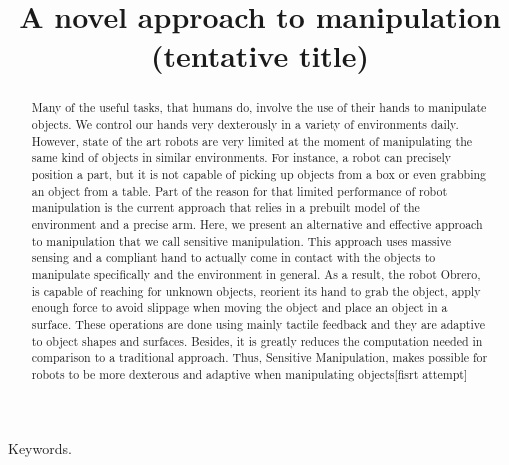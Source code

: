 \documentclass[conference,letterpaper]{IEEEtran}
\begin{document}
\title{\huge A novel approach to manipulation (tentative title)}

\author{
 \and
{}
}

\maketitle
\begin{abstract}
Many of the useful tasks, that humans do, involve the use of their
hands to manipulate objects. We control our hands very dexterously
in a variety of environments daily. However, state of the art
robots are very limited at the moment of manipulating the same
kind of objects in similar environments. For instance, a robot can
precisely position a part, but it is not capable of picking up
objects from a box or even grabbing an object from a table. Part
of the reason for that limited performance of robot manipulation
is the current approach that relies in a prebuilt model of the
environment and a precise arm. Here, we present an alternative and
effective approach to manipulation that we call sensitive
manipulation. This approach uses massive sensing and a compliant
hand to actually come in contact with the objects to manipulate
specifically and the environment in general. As a result, the
robot Obrero, is capable of reaching for unknown objects, reorient
its hand to grab the object, apply enough force to avoid slippage
when moving the object and place an object in a surface. These
operations are done using mainly tactile feedback and they are
adaptive to object shapes and surfaces. Besides, it is greatly
reduces the computation needed in comparison to a traditional
approach. Thus, Sensitive Manipulation, makes possible for robots
to be more dexterous and adaptive when manipulating objects[fisrt
attempt]

\end{abstract}

\begin{keywords}
Keywords.
\end{keywords}
%



%


\end{document}
